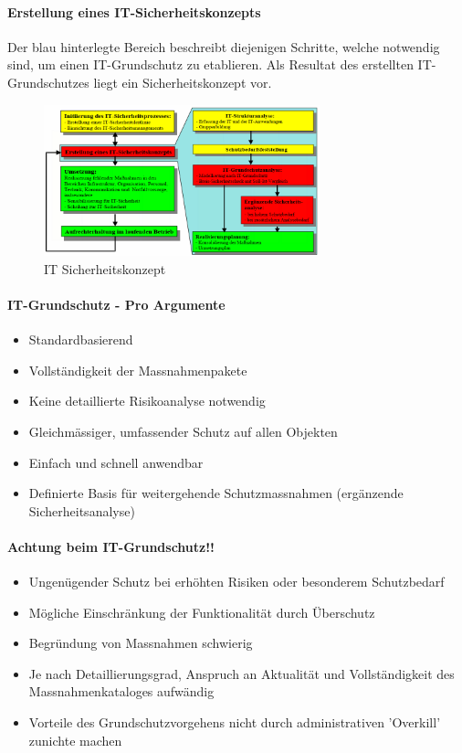\documentclass[10pt,a4paper]{article}
\begin{document}
\paragraph*{Erstellung eines IT-Sicherheitskonzepts} Der blau hinterlegte Bereich beschreibt diejenigen Schritte, welche notwendig sind, um einen IT-Grundschutz zu etablieren. Als Resultat des erstellten IT-Grundschutzes liegt ein Sicherheitskonzept vor.
\begin{figure}[H]
    \begin{center}
    \includegraphics[width=8cm]{images/IT_Sicherheitskonzept.png}
    \caption{IT Sicherheitskonzept}
    \label{IT Sicherheitskonzept}
    \end{center}
\end{figure}

\paragraph*{IT-Grundschutz - Pro Argumente}
\begin{itemize}[noitemsep,topsep=0pt,leftmargin=*]
    \item Standardbasierend
    \item Vollständigkeit der Massnahmenpakete
    \item Keine detaillierte Risikoanalyse notwendig
    \item Gleichmässiger, umfassender Schutz auf
    allen Objekten
    \item Einfach und schnell anwendbar
    \item Definierte Basis für weitergehende
    Schutzmassnahmen (ergänzende
    Sicherheitsanalyse)
\end{itemize}

\paragraph*{Achtung beim IT-Grundschutz!!}
\begin{itemize}[noitemsep,topsep=0pt,leftmargin=*]
    \item Ungenügender Schutz bei erhöhten Risiken
    oder besonderem Schutzbedarf
    \item Mögliche Einschränkung der Funktionalität
    durch Überschutz
    \item Begründung von Massnahmen schwierig
    \item Je nach Detaillierungsgrad, Anspruch an
    Aktualität und Vollständigkeit des
    Massnahmenkataloges aufwändig
    \item Vorteile des Grundschutzvorgehens nicht
    durch administrativen 'Overkill' zunichte
    machen
\end{itemize}
\end{document}
